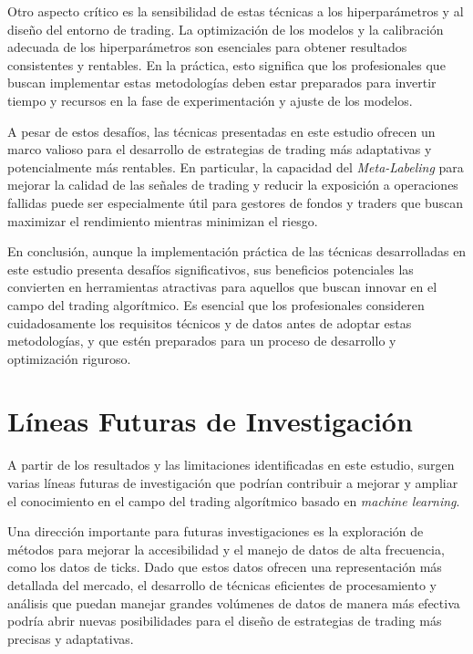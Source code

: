 \documentclass[a4paper,12pt, twoside]{report}
\begin{document}
Otro aspecto crítico es la sensibilidad de estas técnicas a los hiperparámetros y al 
diseño del entorno de trading. La optimización de los modelos y la calibración adecuada 
de los hiperparámetros son esenciales para obtener resultados consistentes y rentables. 
En la práctica, esto significa que los profesionales que buscan implementar estas 
metodologías deben estar preparados para invertir tiempo y recursos en la fase de 
experimentación y ajuste de los modelos.

A pesar de estos desafíos, las técnicas presentadas en este estudio ofrecen un marco 
valioso para el desarrollo de estrategias de trading más adaptativas y potencialmente 
más rentables. En particular, la capacidad del \textit{Meta-Labeling} para mejorar la 
calidad de las señales de trading y reducir la exposición a operaciones fallidas puede 
ser especialmente útil para gestores de fondos y traders que buscan maximizar el rendimiento 
mientras minimizan el riesgo.

En conclusión, aunque la implementación práctica de las técnicas desarrolladas en este 
estudio presenta desafíos significativos, sus beneficios potenciales las convierten en 
herramientas atractivas para aquellos que buscan innovar en el campo del trading algorítmico. 
Es esencial que los profesionales consideren cuidadosamente los requisitos técnicos y de 
datos antes de adoptar estas metodologías, y que estén preparados para un proceso de 
desarrollo y optimización riguroso.

\section{Líneas Futuras de Investigación}

A partir de los resultados y las limitaciones identificadas en este estudio, surgen 
varias líneas futuras de investigación que podrían contribuir a mejorar y ampliar el 
conocimiento en el campo del trading algorítmico basado en \textit{machine learning}.

Una dirección importante para futuras investigaciones es la exploración de métodos 
para mejorar la accesibilidad y el manejo de datos de alta frecuencia, como los datos 
de ticks. Dado que estos datos ofrecen una representación más detallada del mercado, 
el desarrollo de técnicas eficientes de procesamiento y análisis que puedan manejar 
grandes volúmenes de datos de manera más efectiva podría abrir nuevas posibilidades 
para el diseño de estrategias de trading más precisas y adaptativas.
\end{document}
